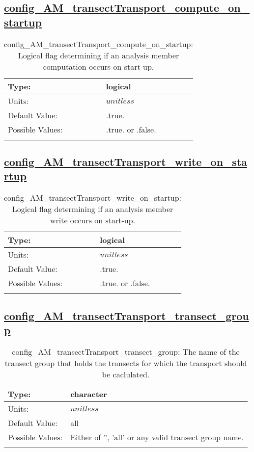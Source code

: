 \subsection[config\_AM\_transectTransport\_compute\_on\_startup]{\hyperref[sec:nm_tab_AM_transectTransport]{config\_AM\_transectTransport\_compute\_on\_startup}}
\label{subsec:nm_sec_config_AM_transectTransport_compute_on_startup}
\begin{center}
\begin{longtable}{| p{2.0in} || p{4.0in} |}
    \hline
    Type: & logical \\
    \hline
    Units: & $unitless$ \\
    \hline
    Default Value: & .true. \\
    \hline
    Possible Values: & .true. or .false. \\
    \hline
    \caption{config\_AM\_transectTransport\_compute\_on\_startup: Logical flag determining if an analysis member computation occurs on start-up.}
\end{longtable}
\end{center}
\subsection[config\_AM\_transectTransport\_write\_on\_startup]{\hyperref[sec:nm_tab_AM_transectTransport]{config\_AM\_transectTransport\_write\_on\_startup}}
\label{subsec:nm_sec_config_AM_transectTransport_write_on_startup}
\begin{center}
\begin{longtable}{| p{2.0in} || p{4.0in} |}
    \hline
    Type: & logical \\
    \hline
    Units: & $unitless$ \\
    \hline
    Default Value: & .true. \\
    \hline
    Possible Values: & .true. or .false. \\
    \hline
    \caption{config\_AM\_transectTransport\_write\_on\_startup: Logical flag determining if an analysis member write occurs on start-up.}
\end{longtable}
\end{center}
\subsection[config\_AM\_transectTransport\_transect\_group]{\hyperref[sec:nm_tab_AM_transectTransport]{config\_AM\_transectTransport\_transect\_group}}
\label{subsec:nm_sec_config_AM_transectTransport_transect_group}
\begin{center}
\begin{longtable}{| p{2.0in} || p{4.0in} |}
    \hline
    Type: & character \\
    \hline
    Units: & $unitless$ \\
    \hline
    Default Value: & all \\
    \hline
    Possible Values: & Either of '', 'all' or any valid transect group name. \\
    \hline
    \caption{config\_AM\_transectTransport\_transect\_group: The name of the transect group that holds the transects for which the transport should be caclulated.}
\end{longtable}
\end{center}
